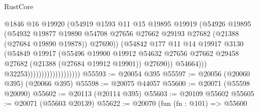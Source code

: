 \begin{lexlean}{RustCore}
\begin{coremodule}
                                            @1846
                                            @16
                                            @19920
                                            (@54919
                                              @1593
                                              @11
                                              @15
                                              @19895
                                              @19919
                                              (@54926
                                                @19895
                                                (@54932
                                                  @19877
                                                  @19890
                                                  @54708
                                                  @27656
                                                  @27662
                                                  @29193
                                                  @27682
                                                  (@21388 (@27684 @19890 @19878))
                                                  @27690))
                                              (@54842
                                                @177
                                                @11
                                                @14
                                                @19917
                                                @3130
                                                (@54849
                                                  @19917
                                                  (@55496
                                                    @19900
                                                    @19912
                                                    @54632
                                                    @27656
                                                    @27662
                                                    @29458
                                                    @27682
                                                    (@21388 (@27684 @19912 @19901))
                                                    @27690))
                                                @54664)))
                                          @32253)))))))))))))))))))
@55593 := @20054 @395
@55597 := @20056 (@20060 @395) (@20066 @395)
@55598 := @20075 @44057
@55600 := @20071 (@55598 @20090)
@55602 := @20113 (@20114 @395)
@55603 := @20109 @55602
@55605 := @20071 (@55603 @20139)
@55622 := @20070
    (fun (fn : @101) =>
    @55600

\end{coremodule}
\end{lexlean}
